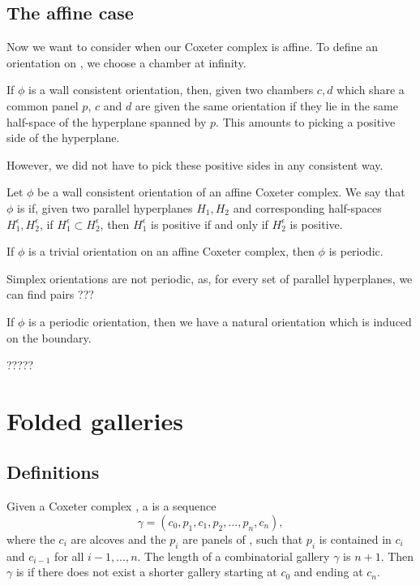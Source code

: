 \documentclass[12pt]{article}
\begin{document}
\subsection{The affine case}

Now we want to consider when our Coxeter complex \sg is affine. To define an orientation on \sg, we choose a chamber at infinity.

If $\phi$ is a wall consistent orientation, then, given two chambers $c,d$ which share a common panel $p$, $c$ and $d$ are given the same orientation if they lie in the same half-space of the hyperplane spanned by $p$. This amounts to picking a positive side of the hyperplane.

However, we did not have to pick these positive sides in any consistent way. 

\begin{definition}
    Let $\phi$ be a wall consistent orientation of an affine Coxeter complex. We say that $\phi$ is  if, given two parallel hyperplanes $H_1,H_2$ and corresponding half-spaces $H_1^{\epsilon},H_2^{\epsilon}$, if $H_1^{\epsilon}\subset H_2^{\epsilon}$, then $H_1^{\epsilon}$ is positive if and only if $H_2^{\epsilon}$ is positive. 
\end{definition}

\begin{example}
    If $\phi$ is a trivial orientation on an affine Coxeter complex, then $\phi$ is periodic. 
\end{example}

\begin{example}
    Simplex orientations are not periodic, as, for every set of parallel hyperplanes, we can find pairs ???
\end{example}

If $\phi$ is a periodic orientation, then we have a natural orientation which is induced on the boundary. 


?????


\section{Folded galleries}
\subsection{Definitions}
\begin{definition}
    Given a Coxeter complex \sg, a  is a sequence
    \[\gamma = (c_0,p_1,c_1,p_2,...,p_n,c_n),\]
    where the $c_i$ are alcoves and the $p_i$ are panels of \sg, such that $p_i$ is contained in $c_i$ and $c_{i-1}$ for all $i-1,...,n$. The length of a combinatorial gallery $\gamma$ is $n+1$. Then $\gamma$ is  if there does not exist a shorter gallery starting at $c_0$ and ending at $c_n$. 
\end{definition}
\end{document}
